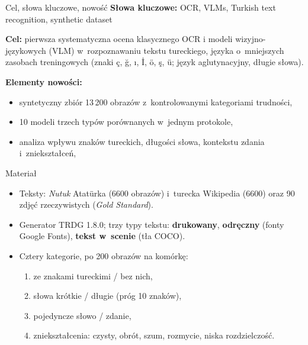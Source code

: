 \documentclass[aspectratio=169,11pt]{beamer}
\begin{document}
\begin{frame}{Cel, słowa kluczowe, nowość}
  \textbf{Słowa kluczowe:} OCR, VLMs, Turkish text recognition, synthetic dataset
  \medskip

  \textbf{Cel:} pierwsza systematyczna ocena klasycznego OCR i modeli wizyjno-językowych (VLM)
  w~rozpoznawaniu tekstu tureckiego, języka o~mniejszych zasobach treningowych
  (znaki ç, ğ, ı, İ, ö, ş, ü; język aglutynacyjny, długie słowa).
  \medskip

  \textbf{Elementy nowości:}
  \begin{itemize}
    \item syntetyczny zbiór 13\,200 obrazów z~kontrolowanymi kategoriami trudności,
    \item 10 modeli trzech typów porównanych w~jednym protokole,
    \item analiza wpływu znaków tureckich, długości słowa, kontekstu zdania i~zniekształceń,
  \end{itemize}
\end{frame}

\begin{frame}{Materiał}
  \begin{itemize}
    \item Teksty: \emph{Nutuk} Atatürka (6600 obrazów) i~turecka Wikipedia (6600) oraz 90 zdjęć rzeczywistych
      (\emph{Gold Standard}).
    \item Generator TRDG 1.8.0; trzy typy tekstu: \textbf{drukowany}, \textbf{odręczny} (fonty
      Google Fonts), \textbf{tekst w~scenie} (tła COCO).
    \item Cztery kategorie, po 200 obrazów na komórkę:
      \begin{enumerate}
        \item ze znakami tureckimi / bez nich,
        \item słowa krótkie / długie (próg 10 znaków),
        \item pojedyncze słowo / zdanie,
        \item zniekształcenia: czysty, obrót, szum, rozmycie, niska rozdzielczość.
      \end{enumerate}
  \end{itemize}
\end{frame}
\end{document}
